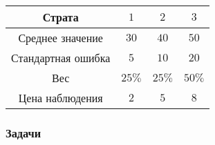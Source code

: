 \begin{enumerate}
	\begin{center}
		\begin{tabular}{cccc}
			\toprule
			Страта & $1$ & $2$ & $3$  \\
			\midrule
			Среднее значение & $30$ & $40$ & $50$ \\
			Стандартная ошибка  & $5$ & $10$ & $20$ \\
			Вес & $25\%$ & $25\%$ & $50\%$ \\
			Цена наблюдения & $2$ & $5$ & $8$ \\
			\bottomrule
		\end{tabular}
	\end{center}
	\end{enumerate}



\subsubsection*{Задачи}

